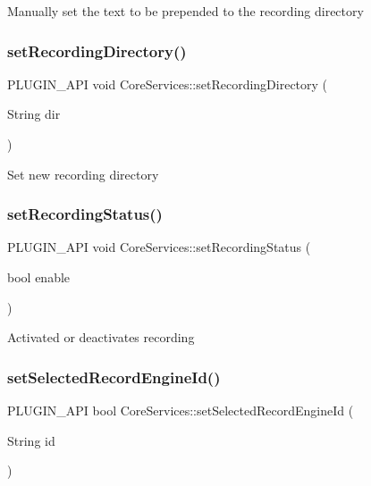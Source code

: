 Manually set the text to be prepended to the recording directory \mbox{\label{namespace_core_services_a5b804cf3cba68340baeb3b7c7173b530}} 
\subsubsection{\texorpdfstring{set\+Recording\+Directory()}{setRecordingDirectory()}}
{\footnotesize\ttfamily P\+L\+U\+G\+I\+N\+\_\+\+A\+PI void Core\+Services\+::set\+Recording\+Directory (\begin{DoxyParamCaption}\item[{String}]{dir }\end{DoxyParamCaption})}

Set new recording directory \mbox{\label{namespace_core_services_a70b56adbc7be044f913f088a162a69fd}} 
\subsubsection{\texorpdfstring{set\+Recording\+Status()}{setRecordingStatus()}}
{\footnotesize\ttfamily P\+L\+U\+G\+I\+N\+\_\+\+A\+PI void Core\+Services\+::set\+Recording\+Status (\begin{DoxyParamCaption}\item[{bool}]{enable }\end{DoxyParamCaption})}

Activated or deactivates recording \mbox{\label{namespace_core_services_a5c4ad031dbb70b1ca2824a12e65dec86}} 
\subsubsection{\texorpdfstring{set\+Selected\+Record\+Engine\+Id()}{setSelectedRecordEngineId()}}
{\footnotesize\ttfamily P\+L\+U\+G\+I\+N\+\_\+\+A\+PI bool Core\+Services\+::set\+Selected\+Record\+Engine\+Id (\begin{DoxyParamCaption}\item[{String}]{id }\end{DoxyParamCaption})}

